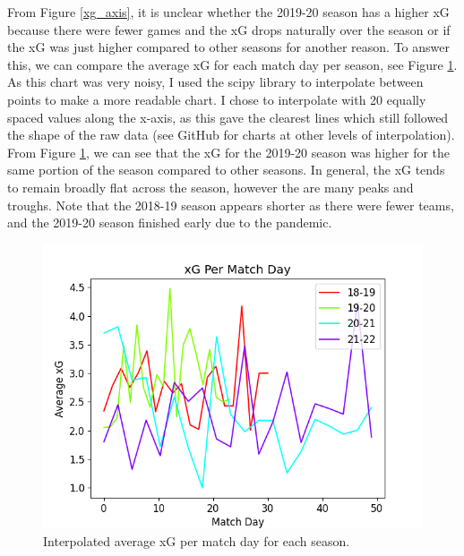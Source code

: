 \documentclass[12pt, a4paper, twocolumn]{article}
\begin{document}
From Figure \ref{xg_axis}, it is unclear whether the 2019-20 season has a higher xG because there were fewer games and the xG drops naturally over the season or if the xG was just higher compared to other seasons for another reason. To answer this, we can compare the average xG for each match day per season, see Figure \ref{xg_match}. As this chart was very noisy, I used the scipy library to interpolate between points to make a more readable chart. I chose to interpolate with 20 equally spaced values along the x-axis, as this gave the clearest lines which still followed the shape of the raw data (see GitHub for charts at other levels of interpolation). From Figure \ref{xg_match}, we can see that the xG for the 2019-20 season was higher for the same portion of the season compared to other seasons. In general, the xG tends to remain broadly flat across the season, however the are many peaks and troughs. Note that the 2018-19 season appears shorter as there were fewer teams, and the 2019-20 season finished early due to the pandemic.

\begin{figure}
  \includegraphics[width=\linewidth]{../vis/fixtures/xg_matchday20.png}
  \caption{Interpolated average xG per match day for each season.}
  \label{xg_match}
\end{figure}
\end{document}
